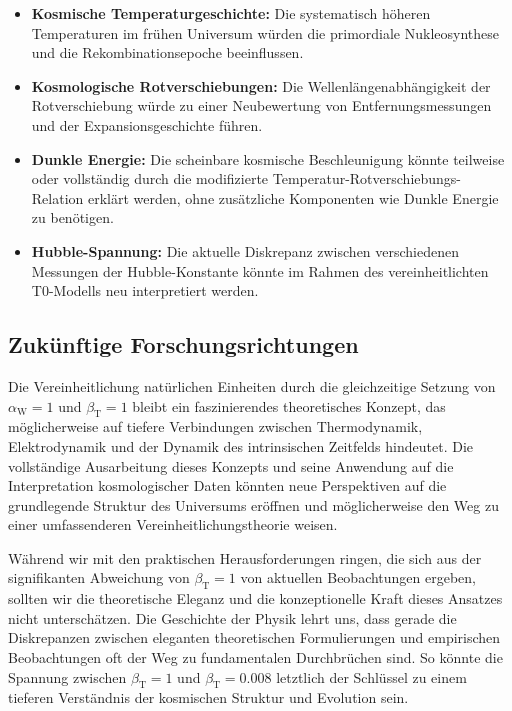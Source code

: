 \documentclass[12pt,a4paper]{article}
\newcommand{\betaT}{\beta_{\text{T}}}
\newcommand{\alphaW}{\alpha_{\text{W}}}
\begin{document}
	\begin{itemize}
		\item \textbf{Kosmische Temperaturgeschichte:} Die systematisch höheren Temperaturen im frühen Universum würden die primordiale Nukleosynthese und die Rekombinationsepoche beeinflussen.
		\item \textbf{Kosmologische Rotverschiebungen:} Die Wellenlängenabhängigkeit der Rotverschiebung würde zu einer Neubewertung von Entfernungsmessungen und der Expansionsgeschichte führen.
		\item \textbf{Dunkle Energie:} Die scheinbare kosmische Beschleunigung könnte teilweise oder vollständig durch die modifizierte Temperatur-Rotverschiebungs-Relation erklärt werden, ohne zusätzliche Komponenten wie Dunkle Energie zu benötigen.
		\item \textbf{Hubble-Spannung:} Die aktuelle Diskrepanz zwischen verschiedenen Messungen der Hubble-Konstante könnte im Rahmen des vereinheitlichten T0-Modells neu interpretiert werden.
	\end{itemize}
	
	\subsection{Zukünftige Forschungsrichtungen}
	
	Die Vereinheitlichung natürlichen Einheiten durch die gleichzeitige Setzung von \(\alphaW = 1\) und \(\betaT = 1\) bleibt ein faszinierendes theoretisches Konzept, das möglicherweise auf tiefere Verbindungen zwischen Thermodynamik, Elektrodynamik und der Dynamik des intrinsischen Zeitfelds hindeutet. Die vollständige Ausarbeitung dieses Konzepts und seine Anwendung auf die Interpretation kosmologischer Daten könnten neue Perspektiven auf die grundlegende Struktur des Universums eröffnen und möglicherweise den Weg zu einer umfassenderen Vereinheitlichungstheorie weisen.
	
	Während wir mit den praktischen Herausforderungen ringen, die sich aus der signifikanten Abweichung von \(\betaT = 1\) von aktuellen Beobachtungen ergeben, sollten wir die theoretische Eleganz und die konzeptionelle Kraft dieses Ansatzes nicht unterschätzen. Die Geschichte der Physik lehrt uns, dass gerade die Diskrepanzen zwischen eleganten theoretischen Formulierungen und empirischen Beobachtungen oft der Weg zu fundamentalen Durchbrüchen sind. So könnte die Spannung zwischen \(\betaT = 1\) und \(\betaT = 0.008\) letztlich der Schlüssel zu einem tieferen Verständnis der kosmischen Struktur und Evolution sein.
	
\end{document}
